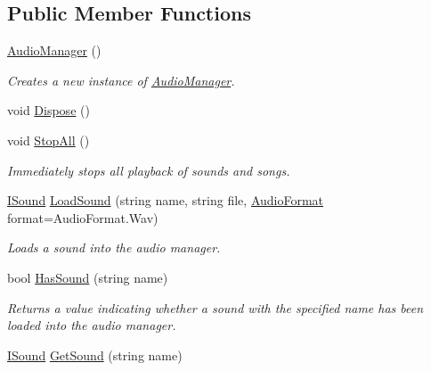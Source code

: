 \subsection*{Public Member Functions}
\begin{DoxyCompactItemize}
\item 
\hyperlink{class_tri_devs_1_1_tri_engine2_d_1_1_audio_1_1_audio_manager_a0d838dafb78ee764eba20c242cf50bb2}{Audio\-Manager} ()
\begin{DoxyCompactList}\small\item\em Creates a new instance of \hyperlink{class_tri_devs_1_1_tri_engine2_d_1_1_audio_1_1_audio_manager}{Audio\-Manager}. \end{DoxyCompactList}\item 
void \hyperlink{class_tri_devs_1_1_tri_engine2_d_1_1_audio_1_1_audio_manager_a1e24a72dae82a81ca9ee88ac70a7312d}{Dispose} ()
\item 
void \hyperlink{class_tri_devs_1_1_tri_engine2_d_1_1_audio_1_1_audio_manager_a97df8c72e846bade6448c0f3d651755a}{Stop\-All} ()
\begin{DoxyCompactList}\small\item\em Immediately stops all playback of sounds and songs. \end{DoxyCompactList}\item 
\hyperlink{interface_tri_devs_1_1_tri_engine2_d_1_1_audio_1_1_i_sound}{I\-Sound} \hyperlink{class_tri_devs_1_1_tri_engine2_d_1_1_audio_1_1_audio_manager_a50f57bb44a55bcc6e8f0ea01b7f4e64e}{Load\-Sound} (string name, string file, \hyperlink{namespace_tri_devs_1_1_tri_engine2_d_1_1_audio_ae238794863562d9b6204219dd29019ff}{Audio\-Format} format=Audio\-Format.\-Wav)
\begin{DoxyCompactList}\small\item\em Loads a sound into the audio manager. \end{DoxyCompactList}\item 
bool \hyperlink{class_tri_devs_1_1_tri_engine2_d_1_1_audio_1_1_audio_manager_abc71f316eef1ea32bc29f8151d1bf31f}{Has\-Sound} (string name)
\begin{DoxyCompactList}\small\item\em Returns a value indicating whether a sound with the specified name has been loaded into the audio manager. \end{DoxyCompactList}\item 
\hyperlink{interface_tri_devs_1_1_tri_engine2_d_1_1_audio_1_1_i_sound}{I\-Sound} \hyperlink{class_tri_devs_1_1_tri_engine2_d_1_1_audio_1_1_audio_manager_ab365101df7bbfce5feb44677553a9655}{Get\-Sound} (string name)

\end{DoxyCompactItemize}
